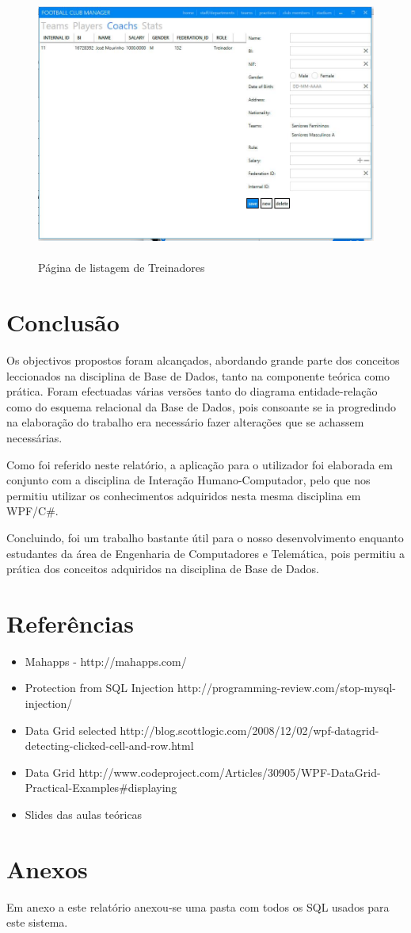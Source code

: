 \documentclass[pdftex,12pt,a4paper]{report}
\begin{document}
\begin{figure}[!htb]
 \includegraphics[width=135mm,scale=1]{app_add_coach.jpg}
 \caption{\\Página de listagem de Treinadores}\label{fig:eer}
\end{figure}


\clearpage
\section{Conclusão}
Os objectivos propostos foram alcançados, abordando grande parte dos conceitos leccionados na disciplina de Base de Dados, tanto na componente teórica como prática.
Foram efectuadas várias versões tanto do diagrama entidade-relação como do esquema relacional da Base de Dados, pois consoante se ia progredindo na elaboração do trabalho era necessário fazer alterações que se achassem necessárias.

Como foi referido neste relatório, a aplicação para o utilizador foi elaborada em conjunto com  a disciplina de Interação Humano-Computador, pelo que nos permitiu utilizar os conhecimentos adquiridos nesta mesma disciplina em WPF/C\#.

Concluindo, foi um trabalho bastante útil para o nosso desenvolvimento enquanto estudantes da área de Engenharia de Computadores e Telemática, pois permitiu a prática dos conceitos adquiridos na disciplina de Base de Dados.

\newpage
\section{Referências}

\begin{itemize}
	\item Mahapps - http://mahapps.com/ 
	\item Protection from SQL Injection http://programming-review.com/stop-mysql-injection/ 
	\item Data Grid selected http://blog.scottlogic.com/2008/12/02/wpf-datagrid-detecting-clicked-cell-and-row.html 
	\item Data Grid http://www.codeproject.com/Articles/30905/WPF-DataGrid-Practical-Examples\#displaying 
	\item Slides das aulas teóricas
\end{itemize}


\newpage
\section{Anexos}
Em anexo a este relatório anexou-se uma pasta com todos os SQL usados para este sistema.
\end{document}
